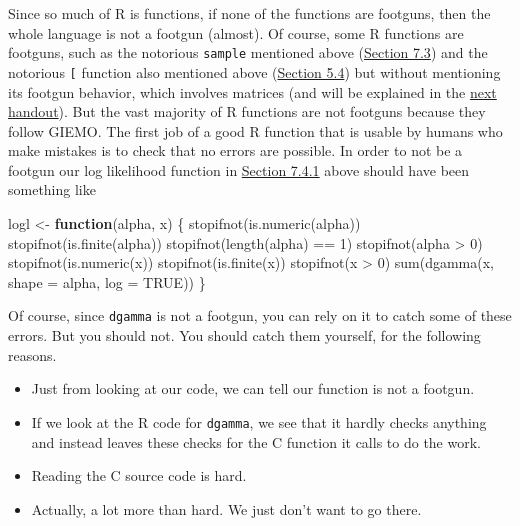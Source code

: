 \documentclass[
]{article}
\newenvironment{Shaded}{\begin{snugshade}}{\end{snugshade}}
\newcommand{\AttributeTok}[1]{\textcolor[rgb]{0.77,0.63,0.00}{#1}}
\newcommand{\ConstantTok}[1]{\textcolor[rgb]{0.00,0.00,0.00}{#1}}
\newcommand{\ControlFlowTok}[1]{\textcolor[rgb]{0.13,0.29,0.53}{\textbf{#1}}}
\newcommand{\DecValTok}[1]{\textcolor[rgb]{0.00,0.00,0.81}{#1}}
\newcommand{\FunctionTok}[1]{\textcolor[rgb]{0.00,0.00,0.00}{#1}}
\newcommand{\NormalTok}[1]{#1}
\newcommand{\OtherTok}[1]{\textcolor[rgb]{0.56,0.35,0.01}{#1}}
\newcommand{\SpecialCharTok}[1]{\textcolor[rgb]{0.00,0.00,0.00}{#1}}
\providecommand{\tightlist}{%
  \setlength{\itemsep}{0pt}\setlength{\parskip}{0pt}}
\begin{document}
Since so much of R is functions, if none of the functions are footguns,
then the whole language is not a footgun (almost). Of course, some R
functions are footguns, such as the notorious \texttt{sample} mentioned
above (\protect\hyperlink{missing-arguments}{Section 7.3}) and the
notorious \texttt{{[}} function also mentioned above
(\protect\hyperlink{indexing}{Section 5.4}) but without mentioning its
footgun behavior, which involves matrices (and will be explained in the
\href{http://www.stat.umn.edu/geyer/3701/notes/array.html\#the-square-brackets-function-is-a-footgun}{next
handout}). But the vast majority of R functions are not footguns because
they follow GIEMO. The first job of a good R function that is usable by
humans who make mistakes is to check that no errors are possible. In
order to not be a footgun our log likelihood function in
\protect\hyperlink{a-long-example-maximum-likelihood-estimation}{Section
7.4.1} above should have been something like

\begin{Shaded}
\begin{Highlighting}[]
\NormalTok{logl }\OtherTok{\textless{}{-}} \ControlFlowTok{function}\NormalTok{(alpha, x) \{}
    \FunctionTok{stopifnot}\NormalTok{(}\FunctionTok{is.numeric}\NormalTok{(alpha))}
    \FunctionTok{stopifnot}\NormalTok{(}\FunctionTok{is.finite}\NormalTok{(alpha))}
    \FunctionTok{stopifnot}\NormalTok{(}\FunctionTok{length}\NormalTok{(alpha) }\SpecialCharTok{==} \DecValTok{1}\NormalTok{)}
    \FunctionTok{stopifnot}\NormalTok{(alpha }\SpecialCharTok{\textgreater{}} \DecValTok{0}\NormalTok{)}
    \FunctionTok{stopifnot}\NormalTok{(}\FunctionTok{is.numeric}\NormalTok{(x))}
    \FunctionTok{stopifnot}\NormalTok{(}\FunctionTok{is.finite}\NormalTok{(x))}
    \FunctionTok{stopifnot}\NormalTok{(x }\SpecialCharTok{\textgreater{}} \DecValTok{0}\NormalTok{)}
    \FunctionTok{sum}\NormalTok{(}\FunctionTok{dgamma}\NormalTok{(x, }\AttributeTok{shape =}\NormalTok{ alpha, }\AttributeTok{log =} \ConstantTok{TRUE}\NormalTok{))}
\NormalTok{\}}
\end{Highlighting}
\end{Shaded}

Of course, since \texttt{dgamma} is not a footgun, you can rely on it to
catch some of these errors. But you should not. You should catch them
yourself, for the following reasons.

\begin{itemize}
\tightlist
\item
  Just from looking at our code, we can tell our function is not a
  footgun.
\item
  If we look at the R code for \texttt{dgamma}, we see that it hardly
  checks anything and instead leaves these checks for the C function it
  calls to do the work.
\item
  Reading the C source code is hard.
\item
  Actually, a lot more than hard. We just don't want to go there.
\end{itemize}
\end{document}
